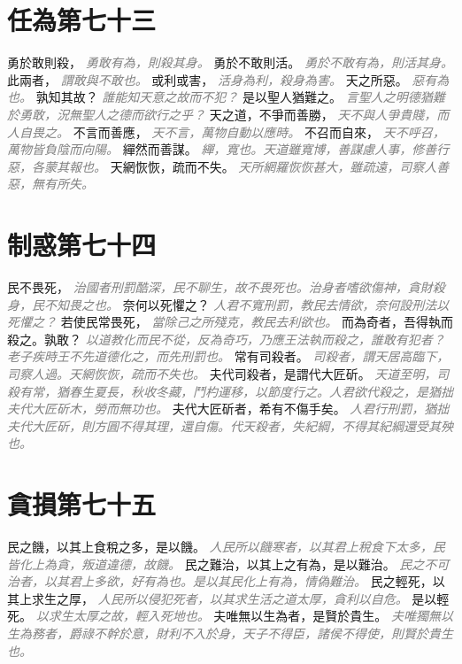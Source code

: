 \documentclass[a4paper,zihao=-4,oneside,landscape,UTF8]{ctexart}
\newcommand{\zhushi}[1]{\scriptsize{\textit{\textcolor{gray}{#1}}}\normalsize}
\begin{document}
\section{任為第七十三}

勇於敢則殺，
\zhushi{勇敢有為，則殺其身。}
勇於不敢則活。
\zhushi{勇於不敢有為，則活其身。}
此兩者，
\zhushi{謂敢與不敢也。}
或利或害，
\zhushi{活身為利，殺身為害。}
天之所惡。
\zhushi{惡有為也。}
孰知其故？
\zhushi{誰能知天意之故而不犯？}
是以聖人猶難之。
\zhushi{言聖人之明德猶難於勇敢，況無聖人之德而欲行之乎？}
天之道，不爭而善勝，
\zhushi{天不與人爭貴賤，而人自畏之。}
不言而善應，
\zhushi{天不言，萬物自動以應時。}
不召而自來，
\zhushi{天不呼召，萬物皆負陰而向陽。}
繟然而善謀。
\zhushi{繟，寬也。天道雖寬博，善謀慮人事，修善行惡，各蒙其報也。}
天網恢恢，疏而不失。
\zhushi{天所網羅恢恢甚大，雖疏遠，司察人善惡，無有所失。}


\section{制惑第七十四}

民不畏死，
\zhushi{治國者刑罰酷深，民不聊生，故不畏死也。治身者嗜欲傷神，貪財殺身，民不知畏之也。}
奈何以死懼之？
\zhushi{人君不寬刑罰，教民去情欲，奈何設刑法以死懼之？}
若使民常畏死，
\zhushi{當除己之所殘克，教民去利欲也。}
而為奇者，吾得執而殺之。孰敢？
\zhushi{以道教化而民不從，反為奇巧，乃應王法執而殺之，誰敢有犯者？老子疾時王不先道德化之，而先刑罰也。}
常有司殺者。
\zhushi{司殺者，謂天居高臨下，司察人過。天網恢恢，疏而不失也。}
夫代司殺者，是謂代大匠斫。
\zhushi{天道至明，司殺有常，猶春生夏長，秋收冬藏，鬥杓運移，以節度行之。人君欲代殺之，是猶拙夫代大匠斫木，勞而無功也。}
夫代大匠斫者，希有不傷手矣。
\zhushi{人君行刑罰，猶拙夫代大匠斫，則方圓不得其理，還自傷。代天殺者，失紀綱，不得其紀綱還受其殃也。}


\section{貪損第七十五}

民之饑，以其上食稅之多，是以饑。
\zhushi{人民所以饑寒者，以其君上稅食下太多，民皆化上為貪，叛道違德，故饑。}
民之難治，以其上之有為，是以難治。
\zhushi{民之不可治者，以其君上多欲，好有為也。是以其民化上有為，情偽難治。}
民之輕死，以其上求生之厚，
\zhushi{人民所以侵犯死者，以其求生活之道太厚，貪利以自危。}
是以輕死。
\zhushi{以求生太厚之故，輕入死地也。}
夫唯無以生為者，是賢於貴生。
\zhushi{夫唯獨無以生為務者，爵祿不幹於意，財利不入於身，天子不得臣，諸侯不得使，則賢於貴生也。}
\end{document}

